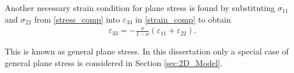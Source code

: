 \documentclass[../../main.tex]{subfiles}ite{VS18}
\begin{document}
Another necessary strain condition for plane stress is found by substituting
$\sigma_{11}$ and $\sigma_{22}$ from \eqref{stress_comp} into
$\varepsilon_{33}$ in \eqref{strain_comp} to obtain
\begin{eqnarray}
	\varepsilon_{33} = -\frac{\nu}{1-\nu} (\varepsilon_{11} + \varepsilon_{22}).\label{plane_stress_neseccary_condition}
\end{eqnarray}

This is known as general plane stress. In this dissertation only a special case
of general plane stress is considered in Section \ref{sec:2D_Model}.
\end{document}
